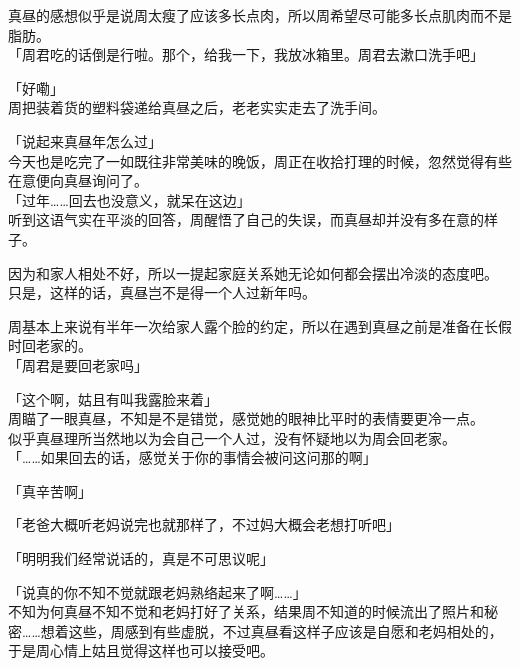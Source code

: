 真昼的感想似乎是说周太瘦了应该多长点肉，所以周希望尽可能多长点肌肉而不是脂肪。\\

「周君吃的话倒是行啦。那个，给我一下，我放冰箱里。周君去漱口洗手吧」

「好嘞」\\

周把装着货的塑料袋递给真昼之后，老老实实走去了洗手间。\\

\vspace{2\baselineskip}

「说起来真昼年怎么过」\\

今天也是吃完了一如既往非常美味的晚饭，周正在收拾打理的时候，忽然觉得有些在意便向真昼询问了。\\

「过年……回去也没意义，就呆在这边」\\

听到这语气实在平淡的回答，周醒悟了自己的失误，而真昼却并没有多在意的样子。

因为和家人相处不好，所以一提起家庭关系她无论如何都会摆出冷淡的态度吧。\\

只是，这样的话，真昼岂不是得一个人过新年吗。

周基本上来说有半年一次给家人露个脸的约定，所以在遇到真昼之前是准备在长假时回老家的。\\

「周君是要回老家吗」

「这个啊，姑且有叫我露脸来着」\\

周瞄了一眼真昼，不知是不是错觉，感觉她的眼神比平时的表情要更冷一点。\\

似乎真昼理所当然地以为会自己一个人过，没有怀疑地以为周会回老家。\\

「……如果回去的话，感觉关于你的事情会被问这问那的啊」

「真辛苦啊」

「老爸大概听老妈说完也就那样了，不过妈大概会老想打听吧」

「明明我们经常说话的，真是不可思议呢」

「说真的你不知不觉就跟老妈熟络起来了啊……」\\

不知为何真昼不知不觉和老妈打好了关系，结果周不知道的时候流出了照片和秘密……想着这些，周感到有些虚脱，不过真昼看这样子应该是自愿和老妈相处的，于是周心情上姑且觉得这样也可以接受吧。

